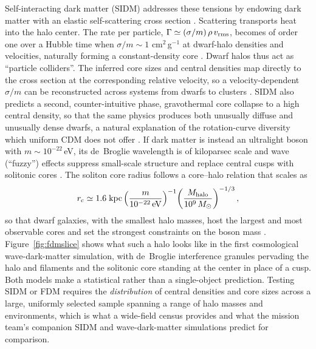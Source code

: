 \documentclass[10pt,onecolumn]{article}
\begin{document}
Self-interacting dark matter (SIDM) addresses these tensions by endowing dark matter with an elastic self-scattering cross section \cite{spergel2000}. Scattering transports heat into the halo center. The rate per particle, $\Gamma\simeq(\sigma/m)\,\rho\,v_{\rm rms}$, becomes of order one over a Hubble time when $\sigma/m\sim1$ cm$^2$\,g$^{-1}$ at dwarf-halo densities and velocities, naturally forming a constant-density core \cite{tulinyu2018}. Dwarf halos thus act as ``particle colliders''. The inferred core sizes and central densities map directly to the cross section at the corresponding relative velocity, so a velocity-dependent $\sigma/m$ can be reconstructed across systems from dwarfs to clusters \cite{kaplinghat2016}. SIDM also predicts a second, counter-intuitive phase, gravothermal core collapse to a high central density, so that the same physics produces both unusually diffuse and unusually dense dwarfs, a natural explanation of the rotation-curve diversity which uniform CDM does not offer \cite{ren2019}. If dark matter is instead an ultralight boson with $m\sim10^{-22}$\,eV, its de~Broglie wavelength is of kiloparsec scale and wave (``fuzzy'') effects suppress small-scale structure and replace central cusps with solitonic cores \cite{hu2000,schive2014}. The soliton core radius follows a core--halo relation that scales as
\begin{equation}
r_{\rm c}\simeq1.6\;{\rm kpc}\left(\frac{m}{10^{-22}\,\rm eV}\right)^{-1}\!\left(\frac{M_{\rm halo}}{10^{9}\,M_\odot}\right)^{-1/3},
\label{eq:soliton}
\end{equation}
so that dwarf galaxies, with the smallest halo masses, host the largest and most observable cores and set the strongest constraints on the boson mass \cite{schive2014}. Figure~\ref{fig:fdmslice} shows what such a halo looks like in the first cosmological wave-dark-matter simulation, with de~Broglie interference granules pervading the halo and filaments and the solitonic core standing at the center in place of a cusp. Both models make a statistical rather than a single-object prediction. Testing SIDM or FDM requires the \emph{distribution} of central densities and core sizes across a large, uniformly selected sample spanning a range of halo masses and environments, which is what a wide-field census provides and what the mission team's companion SIDM and wave-dark-matter simulations predict for comparison.
\end{document}
